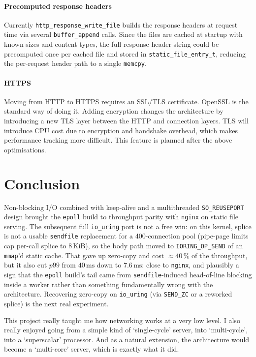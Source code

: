 \documentclass{article}
\begin{document}
\paragraph{Precomputed response headers}
Currently \texttt{http\_response\_write\_file} builds the response headers at request time via several \texttt{buffer\_append} calls. Since the files are cached at startup with known sizes and content types, the full response header string could be precomputed once per cached file and stored in \texttt{static\_file\_entry\_t}, reducing the per-request header path to a single \texttt{memcpy}.

\paragraph{HTTPS}
Moving from HTTP to HTTPS requires an SSL/TLS certificate. OpenSSL is the standard way of doing it. Adding encryption changes the architecture by introducing a new TLS layer between the HTTP and connection layers. TLS will introduce CPU cost due to encryption and handshake overhead, which makes performance tracking more difficult. This feature is planned after the above optimisations.

\section{Conclusion}

Non-blocking I/O combined with keep-alive and a multithreaded \texttt{SO\_REUSEPORT} design brought the \texttt{epoll} build to throughput parity with \texttt{nginx} on static file serving. The subsequent full \texttt{io\_uring} port is not a free win: on this kernel, splice is not a usable \texttt{sendfile} replacement for a 400-connection pool (pipe-page limits cap per-call splice to 8\,KiB), so the body path moved to \texttt{IORING\_OP\_SEND} of an \texttt{mmap}'d static cache. That gave up zero-copy and cost $\approx 40\,\%$ of the throughput, but it also cut $p99$ from $40\,\mathrm{ms}$ down to $7.6\,\mathrm{ms}$: close to \texttt{nginx}, and plausibly a sign that the \texttt{epoll} build's tail came from \texttt{sendfile}-induced head-of-line blocking inside a worker rather than something fundamentally wrong with the architecture. Recovering zero-copy on \texttt{io\_uring} (via \texttt{SEND\_ZC} or a reworked splice) is the next real experiment.

This project really taught me how networking works at a very low level. I also really enjoyed going from a simple kind of `single-cycle' server, into `multi-cycle', into a `superscalar' processor. And as a natural extension, the architecture would become a `multi-core' server, which is exactly what it did.
\end{document}
